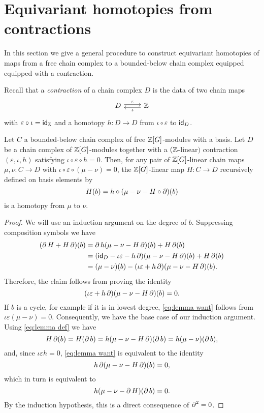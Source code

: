 
\section{Equivariant homotopies from contractions}\label{s:equivariant homotopy general}

In this section we give a general procedure to construct equivariant homotopies of maps from a free chain complex to a bounded-below chain complex equipped equipped with a contraction.

Recall that a \textit{contraction} of a chain complex $D$ is the data of two chain maps
\[
\begin{tikzcd}
	D \arrow[r,"\varepsilon", shift left=2pt] & \Z \arrow[l, "\iota", shift left=2pt]
\end{tikzcd}
\]
with $\varepsilon \circ \iota = \mathsf{id}_{\mathbb{Z}}$ and a homotopy $h \colon D \to D$ from $\iota \circ \varepsilon$ to $\mathsf{id}_D$.

\begin{lemma}
	Let $C$ a bounded-below chain complex of free $\mathbb{Z}[G]$-modules with a basis.
	Let $D$ be a chain complex of $\mathbb{Z}[G]$-modules together with a $(\mathbb{Z}$-linear$)$ contraction $(\varepsilon, \iota, h)$ satisfying $\iota \circ \varepsilon \circ h = 0$.
	Then, for any pair of $\mathbb{Z}[G]$-linear chain maps $\mu,\nu \colon C \to D$ with $\iota \circ \varepsilon \circ (\mu -\nu) = 0$, the $\mathbb{Z}[G]$-linear map $H \colon C \to D$ recursively defined on basis elements by
	\begin{equation}\label{eq:lemma def}
		H(b) = h \circ (\mu - \nu - H \circ \operatorname{\partial})(b)
	\end{equation}
	is a homotopy from $\mu$ to $\nu$.
\end{lemma}

\begin{proof}
	We will use an induction argument on the degree of $b$.
	Suppressing composition symbols we have
	\begin{align*}
		(\operatorname{\partial} H + H \operatorname{\partial})(b)
		&= \operatorname{\partial} h(\mu - \nu - H \operatorname{\partial})(b) + H \operatorname{\partial} (b) \\
		&= (\mathsf{id}_D - \iota\varepsilon - h \operatorname{\partial})(\mu - \nu - H \operatorname{\partial})(b) + H \operatorname{\partial}(b) \\
		&= (\mu-\nu)(b) - (\iota\varepsilon + h \operatorname{\partial})(\mu - \nu - H \operatorname{\partial})(b).
	\end{align*}
	Therefore, the claim follows from proving the identity
	\begin{equation}\label{eq:lemma want}
		(\iota\varepsilon + h \operatorname{\partial})(\mu - \nu - H \operatorname{\partial})(b) = 0.
	\end{equation}
	If $b$ is a cycle, for example if it is in lowest degree, \eqref{eq:lemma want} follows from $\iota\varepsilon(\mu-\nu) = 0$.
	Consequently, we have the base case of our induction argument.
	Using \eqref{eq:lemma def} we have
	\[
	H\operatorname{\partial} (b) = H(\operatorname{\partial} b) = h(\mu-\nu-H\operatorname{\partial})(\operatorname{\partial} b) = h(\mu-\nu)(\operatorname{\partial} b),
	\]
	and, since $\iota\varepsilon h = 0$, \eqref{eq:lemma want} is equivalent to the identity
	\[
	h \operatorname{\partial} (\mu-\nu - H\operatorname{\partial})(b) = 0,
	\]
	which in turn is equivalent to
	\[
	h (\mu-\nu - \operatorname{\partial} H)(\operatorname{\partial} b) = 0.
	\]
	By the induction hypothesis, this is a direct consequence of $\operatorname{\partial}^2 = 0$.
\end{proof}